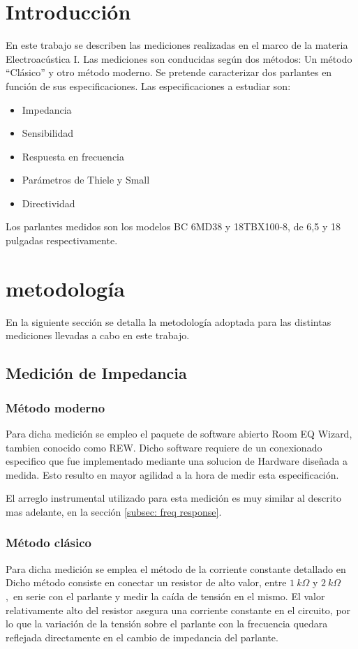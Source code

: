 \documentclass[]{article}
\begin{document}
\begin{multicols}{2}
\section{Introducción}
En este trabajo se describen las mediciones realizadas en el marco de la materia
Electroacústica I. Las mediciones son conducidas según dos métodos: Un método ``Clásico'' y otro método
moderno. Se pretende caracterizar dos parlantes en función de sus especificaciones.
Las especificaciones a estudiar son:
\begin{itemize}
  \item Impedancia
  \item Sensibilidad
  \item Respuesta en frecuencia
  \item Parámetros de Thiele y Small
  \item{Directividad}
\end{itemize}

Los parlantes medidos son los modelos BC 6MD38 y 18TBX100-8, de 6,5 y 18
pulgadas respectivamente.
\section{metodología}
En la siguiente sección se detalla la metodología adoptada para las distintas
mediciones llevadas a cabo en este trabajo.

\subsection{Medición de Impedancia}

\subsubsection{Método moderno}
\label{subsec: z moderno}
Para dicha medición se empleo el paquete de software abierto Room EQ Wizard, tambien
conocido como REW. Dicho software requiere de un conexionado especifico que
fue implementado mediante una solucion de Hardware diseñada a medida. Esto resulto
en mayor agilidad a la hora de medir esta especificación.

El arreglo instrumental utilizado para esta medición es muy similar al descrito
mas adelante, en la sección \ref{subsec: freq response}.

\subsubsection{Método clásico}
\label{z clasica}
Para dicha medición se emplea el método de la corriente constante detallado en \cite{Ruffa}
Dicho método consiste en conectar un resistor de alto valor, entre $ 1 \ k\Omega$ y
$2 \ k\Omega$,\ en serie con el parlante y medir la caída de tensión en el mismo.
El valor relativamente alto del resistor asegura una corriente constante en el
circuito, por lo que la variación de la tensión sobre el parlante con la frecuencia
quedara reflejada directamente en el cambio de impedancia del parlante.


\end{multicols}
\end{document}
